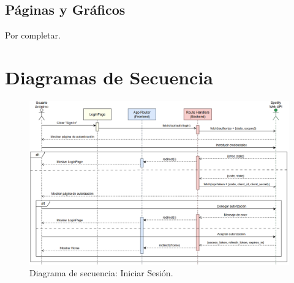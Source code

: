 \subsection{Páginas y Gráficos}

Por completar.






\section{Diagramas de Secuencia}

\begin{figure}[H]
    \centering
    \includegraphics[width=\textwidth]{figures/diagramas_secuencia/ds_iniciar_sesion.png}
    \caption{Diagrama de secuencia: Iniciar Sesión.}
    \label{fig:ds_iniciar_sesion}
\end{figure}

